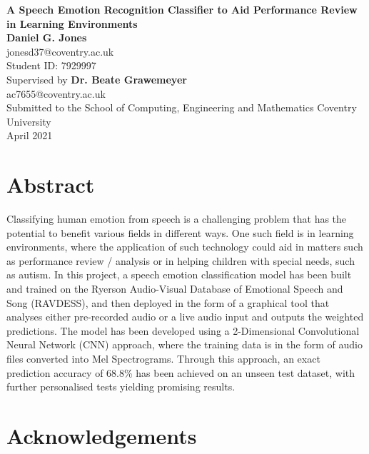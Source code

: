 \documentclass[12pt]{article}
\begin{document}

\begin{center}
	\vspace*{1cm}
	\Huge \textbf{A Speech Emotion Recognition Classifier to Aid Performance Review in Learning Environments} \\[1em]
	\vspace{5cm}
	\LARGE \textbf{Daniel G. Jones}
	\\
	\vspace{0.3cm}
	\large jonesd37@coventry.ac.uk
	\\
	\large Student ID: 7929997
	\\
	\vspace{3cm}
	\large Supervised by \textbf{Dr. Beate Grawemeyer}
	\\
	\vspace{0.3cm}
	\large ac7655@coventry.ac.uk
	\\
	\vspace{3cm}
	\large Submitted to the School of Computing, Engineering and Mathematics Coventry University
	\\
	April 2021
\end{center}
\newpage
\tableofcontents
\newpage
\section{Abstract}

Classifying human emotion from speech is a challenging problem that has the potential to benefit various fields in different ways. One such field is in learning environments, where the application of such technology could aid in matters such as performance review / analysis or in helping children with special needs, such as autism. In this project, a speech emotion classification model has been built and trained on the Ryerson Audio-Visual Database of Emotional Speech and Song (RAVDESS), and then deployed in the form of a graphical tool that analyses either pre-recorded audio or a live audio input and outputs the weighted predictions. The model has been developed using a 2-Dimensional Convolutional Neural Network (CNN) approach, where the training data is in the form of audio files converted into Mel Spectrograms. Through this approach, an exact prediction accuracy of 68.8\% has been achieved on an unseen test dataset, with further personalised tests yielding promising results.

\section{Acknowledgements}
\end{document}
